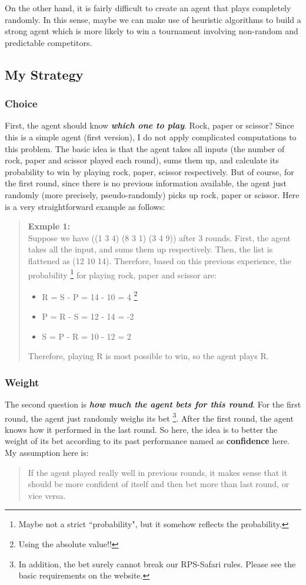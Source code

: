 \documentclass[10pt]{article}
\begin{document}
On the other hand, it is fairly difficult to create an agent that plays completely randomly. In this sense, maybe we can make use of heuristic algorithms to build a strong agent which is more likely to win a tournament involving non-random and predictable competitors.

\subsection{My Strategy}

\subsubsection{Choice}
First, the agent should know \textbf{\textit{which one to play}}. Rock, paper or scissor? Since this is a simple agent (first version), I do not apply complicated computations to this problem. The basic idea is that the agent takes all inputs (the number of rock, paper and scissor played each round), sums them up, and calculate its probability to win by playing rock, paper, scissor respectively. But of course, for the first round, since there is no previous information available, the agent just randomly (more precisely, pseudo-randomly) picks up rock, paper or scissor. Here is a very straightforward example as follows:
\begin{quote}
\textbf{Exmple 1:}\\
Suppose we have ((1 3 4) (8 3 1) (3 4 9)) after 3 rounds. First, the agent takes all the input, and sums them up respectively. Then, the list is flattened as (12 10 14). Therefore, based on this previous experience, the probability \footnote{Maybe not a strict ``probability", but it somehow reflects the probability.} for playing rock, paper and scissor are:
\begin{itemize}
\item R = S - P = 14 - 10 = 4 \footnote{Using the absolute value!!}
\item P = R - S = 12 - 14 = -2
\item S = P - R = 10 - 12 = 2
\end{itemize}
Therefore, playing R is most possible to win, so the agent plays R.
\end{quote}

\subsubsection{Weight}
The second question is \textbf{\textit{how much the agent bets for this round}}. For the first round, the agent just randomly weighs its bet \footnote{In addition, the bet surely cannot break  our RPS-Safari rules. Please see the basic requirements on the website.}. After the first round, the agent knows how it performed in the last round. So here, the idea is to better the weight of its bet according to its past performance named as \textbf{confidence} here. My assumption here is:
\begin{quote}
If the agent played really well in previous rounds, it makes sense that it should be more confident of itself and then bet more than last round, or vice versa.
\end{quote}
\end{document}
